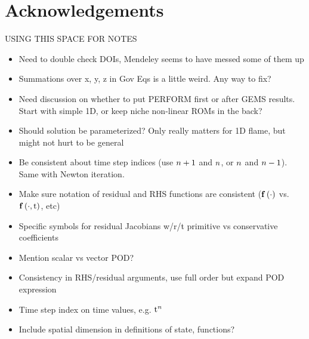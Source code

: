 \chapter{Acknowledgements}

{\color{red}
USING THIS SPACE FOR NOTES
\begin{itemize}
	\item Need to double check DOIs, Mendeley seems to have messed some of them up
	\item Summations over x, y, z in Gov Eqs is a little weird. Any way to fix?
	\item Need discussion on whether to put PERFORM first or after GEMS results. Start with simple 1D, or keep niche non-linear ROMs in the back?
	\item Should solution be parameterized? Only really matters for 1D flame, but might not hurt to be general
	\item Be consistent about time step indices (use $n + 1$ and $n$, or $n$ and $n - 1$). Same with Newton iteration.
	\item Make sure notation of residual and RHS functions are consistent ($\mathbf{f} \left(\cdot\right)$ vs. $\mathbf{f} \left(\cdot, \text{t}\right)$, etc)
	\item Specific symbols for residual Jacobians w/r/t primitive vs conservative coefficients
	\item Mention scalar vs vector POD?
	\item Consistency in RHS/residual arguments, use full order but expand POD expression
	\item Time step index on time values, e.g. $\text{t}^{n}$
	\item Include spatial dimension in definitions of state, functions?
\end{itemize}

}